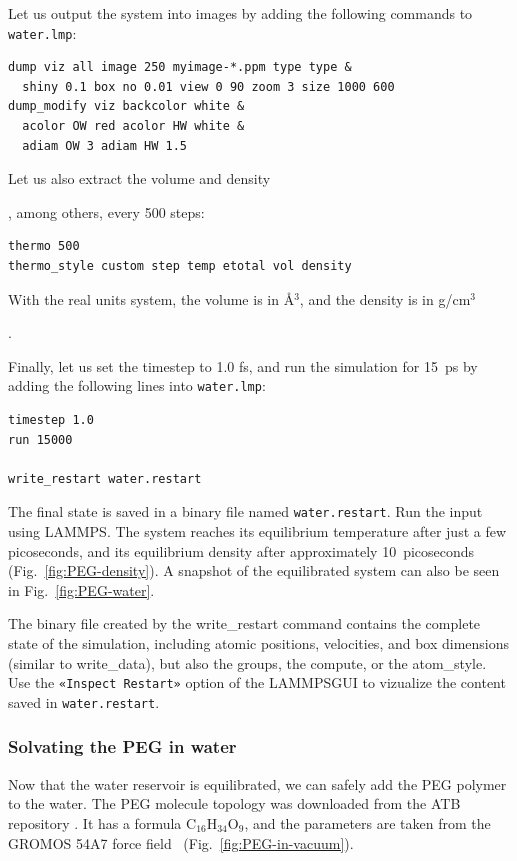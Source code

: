 \documentclass[9pt,tutorial]{livecoms}
\newcommand{\lmpcmdnote}[1]{\hspace{0pt}\colorbox{note_listing}{\textcolor{command}{\small{#1}}}\hspace{0pt}} %
\newcommand{\flecmd}[1]{\textcolor{command}{\texttt{#1}}} %
\newcommand{\guicmd}[1]{\textcolor{command}{\texttt{«#1»}}} %
\newcommand{\lammpsgui}{\textsf{LAMMPS\textendash GUI}}
\begin{document}
Let us output the system into images by adding the following commands to \flecmd{water.lmp}:
\begin{lstlisting}
dump viz all image 250 myimage-*.ppm type type &
  shiny 0.1 box no 0.01 view 0 90 zoom 3 size 1000 600
dump_modify viz backcolor white &
  acolor OW red acolor HW white &
  adiam OW 3 adiam HW 1.5
\end{lstlisting}
Let us also extract the volume and density{\color{blue}, among others, every 500 steps:
\begin{lstlisting}
thermo 500
thermo_style custom step temp etotal vol density
\end{lstlisting}
With the real units system, the volume is in Å$^3$, and
the density is in g/cm$^3$}.

Finally, let us set the timestep to 1.0 fs, and run the simulation for 15~ps by
adding the following lines into \flecmd{water.lmp}:
\begin{lstlisting}
timestep 1.0
run 15000

write_restart water.restart
\end{lstlisting}
The final state is saved in a binary file named \flecmd{water.restart}.
Run the input using LAMMPS.  The system reaches its equilibrium temperature
after just a few picoseconds, and its equilibrium density after approximately
10~picoseconds (Fig.~\ref{fig:PEG-density}).  A snapshot of the equilibrated
system can also be seen in Fig.~\ref{fig:PEG-water}.

\begin{note}
The binary file created by the \lmpcmdnote{write\_restart} command contains the
complete state of the simulation, including atomic positions, velocities, and
box dimensions (similar to \lmpcmdnote{write\_data}), but also the groups,
the compute, or the \lmpcmdnote{atom\_style}.  Use the \guicmd{Inspect Restart}
option of the \lammpsgui{} to vizualize the content saved in \flecmd{water.restart}.
\end{note}

\subsubsection{Solvating the PEG in water}

Now that the water reservoir is equilibrated, we can safely add the PEG polymer
to the water.  The PEG molecule topology was downloaded from the ATB repository
\cite{malde2011automated, oostenbrink2004biomolecular}.  It has a formula
$\text{C}_{16}\text{H}_{34}\text{O}_{9}$, and the parameters are taken from
the {GROMOS} 54A7 force field~\cite{schmid2011definition} (Fig.~\ref{fig:PEG-in-vacuum}).
\end{document}
